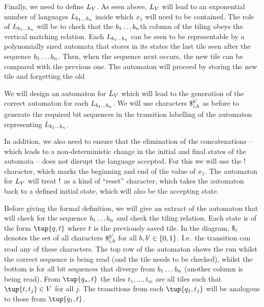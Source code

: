 \documentclass{article}
\begin{document}
Finally, we need to define $L_\vcons$.
As seen above, $L_\vcons$ will lead to an exponential number of languages
$L_{\bit_1\ldots\bit_n}$
inside which $x_1$ will need to be contained.
The role of
$L_{\bit_1\ldots\bit_n}$
will be to check that the
$\bit_1\ldots\bit_n$th
column of the tiling obeys the vertical matching relation.
Each
$L_{\bit_1\ldots\bit_n}$
can be seen to be representable by a polynomially sized automata that stores in its states the last tile seen after the sequence
$\bit_1\ldots\bit_n$.
Then, when the sequence next occurs, the new tile can be compared with the previous one.
The automaton will proceed by storing the new tile and forgetting the old.

We will design an automaton for $L_\vcons$ which will lead to the generation of the correct automaton for each
$L_{\bit_1\ldots\bit_n}$.
We will use characters
$\repl{i}{\bit}{\bit'}$
as before to generate the required bit sequences in the transition labelling of the automaton representing
$L_{\bit_1\ldots\bit_n}$.

In addition, we also need to ensure that the elimination of the concatenations -- which leads to a non-deterministic change in the initial and final states of the automata -- does not disrupt the language accepted.
For this we will use the $\resetchar$ character, which marks the beginning and end of the value of $x_1$.
The automaton for $L_\vcons$ will treat $\resetchar$ as a kind of ``reset'' character, which takes the automaton back to a defined initial state, which will also be the accepting state.

Before giving the formal definition, we will give an extract of the automaton that will check for the sequence
$\bit_1\ldots\bit_n$
and check the tiling relation.
Each state is of the form $\tup{q, \tile}$ where $\tile$ is the previously saved tile.
In the diagram, $\replall{i}$ denotes the set of all characters
$\repl{i}{\bit}{\bit'}$
for all $\bit, \bit' \in \set{0,1}$.
I.e.\ the transition can read any of these characters.
The top row of the automaton shows the run whilst the correct sequence is being read (and the tile needs to be checked), whilst the bottom is for all bit sequences that diverge from
$\bit_1\ldots\bit_n$
(another column is being read).
From $\tup{q_n, \tile}$ the tiles
$t_1, \ldots, t_m$
are all tiles such that
$\tup{t, t_j} \in \vcons$
for all $j$.
The transitions from each
$\tup{q_1, \tile_j}$
will be analogous to those from
$\tup{q_1, \tile}$.
\end{document}
